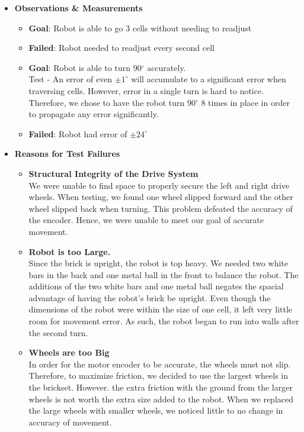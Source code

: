\documentclass[11pt]{article}
\begin{document}
\begin{itemize}
\item \textbf{Observations \& Measurements}
	\begin{itemize}
	\item \textbf{Goal}: Robot is able to go 3 cells without needing to readjust
	\item \textbf{Failed}: Robot needed to readjust every second cell
	\item \textbf{Goal}: Robot is able to turn 90$^{\circ}$ accurately.\\
	Test - An error of even $ \pm 1^{\circ}$ will accumulate to a significant error when traversing cells. However, error in a single turn is hard to notice. Therefore, we chose to have the robot turn 90$^{\circ}$ 8 times in place in order to propagate any error significantly.
	\item \textbf{Failed}: Robot had error of $ \pm 24^{\circ}$
	\end{itemize}
\item \textbf{Reasons for Test Failures}
	\begin{itemize}
	\item \textbf{Structural Integrity of the Drive System}\\
	We were unable to find space to properly secure the left and right drive wheels. When testing, we found one wheel slipped forward and the other wheel slipped back when turning. This problem defeated the accuracy of the encoder. Hence, we were unable to meet our goal of accurate movement.
	\item \textbf{Robot is too Large.}\\
	Since the brick is upright, the robot is top heavy. We needed two white bars in the back and one metal ball in the front to balance the robot. The additions of the two white bars and one metal ball negates the spacial advantage of having the robot's brick be upright. Even though the dimensions of the robot were within the size of one cell, it left very little room for movement error. As such, the robot began to run into walls after the second turn.
	\item \textbf{Wheels are too Big}\\
	In order for the motor encoder to be accurate, the wheels must not slip. Therefore, to maximize friction, we decided to use the largest wheels in the brickset. However. the extra friction with the ground from the larger wheels is not worth the extra size added to the robot. When we replaced the large wheels with smaller wheels, we noticed little to no change in accuracy of movement.

\end{itemize}
\end{itemize}
\end{document}
